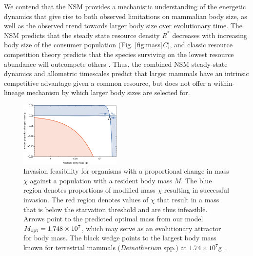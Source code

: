 \documentclass[twocolumn,preprintnumbers,amsmath,amssymb,superscriptaddress]{revtex4}
\begin{document}
\begin{bibunit}[unsrt]
We contend that the NSM provides a mechanistic understanding of the energetic dynamics that give rise to both observed limitations on mammalian body size, as well as the observed trend towards larger body size over evolutionary time.
The NSM predicts that the steady state resource density $R^{*}$ decreases with increasing body size of the consumer population (Fig. \ref{fig:mass}\emph{C}), and classic resource competition theory predicts that the species surviving on the lowest resource abundance will outcompete others \cite{tilman1981,dutkiewicz2009,barton2010}. Thus, the combined NSM steady-state dynamics and allometric timescales predict that larger mammals have an intrinsic competitive advantage given a common resource, but does not offer a within-lineage mechanism by which larger body sizes are selected for.

\begin{figure}
\centering
\includegraphics[width=0.45\textwidth]{fig_Invasion.pdf}
\caption{ Invasion feasibility for organisms with a proportional change in
  mass $\chi$ against a population with a resident body mass $M$.  The blue
  region denotes proportions of modified mass $\chi$ resulting in successful invasion.  The
  red region denotes values of $\chi$ that result in a mass that is below the
  starvation threshold and are thus infeasible.
  Arrows point to the predicted optimal mass from our model $M_{\rm opt}=1.748\times 10^7$, which may serve as an evolutionary attractor for body mass.
  The black wedge points to the largest body mass known for terrestrial mammals (\emph{Deinotherium} spp.) at $1.74\times10^7$g~\cite{Smith:2010p3442}.}
\label{fig:invasion}
\end{figure}


\end{bibunit}
\end{document}
